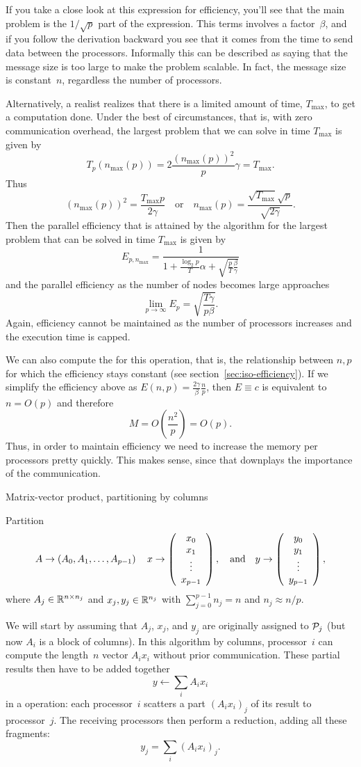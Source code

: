 If you take a close look at this expression for efficiency,
you'll see that the main problem is the $1/\sqrt p$ part of the
expression. This terms involves a factor~$\beta$, and if you follow
the derivation backward you see that it comes from the time to send
data between the processors. Informally this can be described as
saying that the message size is too large to make the problem
scalable. In fact, the message size is constant~$n$, regardless the
number of processors.

Alternatively, a realist realizes that there is a limited amount of time,
$ T_{\max} $, to get a computation done.
Under the best of circumstances, 
that is, with zero communication overhead, the largest problem
that we can solve in time $ T_{\max} $ is given by
\[ 
T_p(n_{\max}(p)) = 2 \frac{(n_{\max}(p))^2}{p} \gamma = T_{\max} .
\]
Thus
\[
(n_{\max}(p))^2 = \frac{T_{\max} p}{2 \gamma}
\quad
\mbox{or}
\quad
n_{\max}(p) = \frac{\sqrt{T_{\max}} \sqrt{p}}{\sqrt{2 \gamma}}.
\]
Then the parallel efficiency that is attained by the algorithm for the largest
problem that can be solved in time $ T_{\max} $ is given by
\[
  E_{p,n_{\max}}=\frac1
  {1+\frac{\log_2p}T\alpha+\sqrt{\frac pT\frac \beta\gamma}}
\]
and the parallel efficiency as the number of nodes becomes large approaches
\[
\lim_{p\rightarrow\infty}E_p= \sqrt{\frac{T\gamma}{p\beta}}.
\]
Again, efficiency cannot be maintained as the number of processors
increases and the execution time is capped.

We can also compute the  for this
operation, that is, the relationship between $n,p$ for which the
efficiency stays constant (see section~\ref{sec:iso-efficiency}). If
we simplify the efficiency above as
$E(n,p)=\frac{2\gamma}{\beta}\frac{n}{p}$, then $E\equiv c$ is
equivalent to $n=O(p)$ and therefore
\[ M=O\left(\frac{n^2}{p}\right)=O(p). \]
Thus, in order to maintain efficiency we need to increase the memory
per processors pretty quickly. This makes sense, since that downplays
the importance of the communication.

 {Matrix-vector product, partitioning by columns}

Partition
\[
A \rightarrow \left(A_0, A_1, \ldots, A_{p-1}\right) 
\quad
x \rightarrow \left( \begin{array}{c} x_0 \\ x_1 \\ \vdots \\ x_{p-1} \end{array} \right) ,
\quad
\mbox{and}
\quad
y \rightarrow \left( \begin{array}{c} y_0 \\ y_1 \\ \vdots \\ y_{p-1} \end{array} \right) ,
\]
where $ A_j \in \mathbb{R}^{n \times n_j} $ and $ x_j, y_j \in \mathbb{R}^{n_j} $ with
$ \sum_{j=0}^{p-1} n_j = n $ and $ n_j \approx n / p $.

We will start by assuming that $ A_j $, $ x_j $, and $ y_j $ are
originally assigned to $ {\cal P}_j $ (but now $ A_i $ is a block of
columns). In this algorithm by columns, processor~$i$ can compute the
length~$n$ vector $A_ix_i$ without prior communication. These partial
results then have to be added together
\[ y\leftarrow \sum_i A_ix_i \]
in a  operation: each processor~$i$ scatters
a part $(A_ix_i)_j$ of its result to processor~$j$. The receiving
processors then perform a reduction, adding all these fragments: 
\[ y_j = \sum_i (A_ix_i)_j. \]

